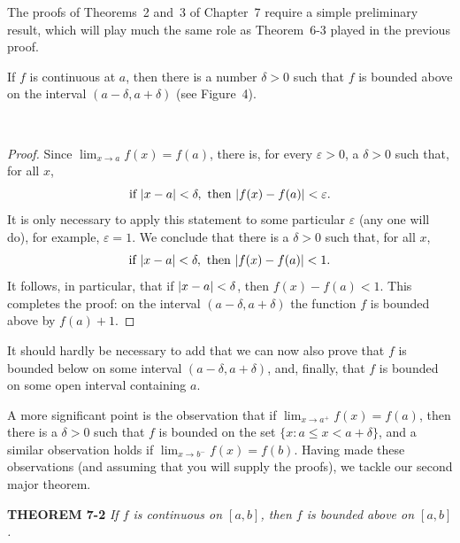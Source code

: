 The proofs of Theorems~2 and~3 of Chapter~7 require a simple preliminary
result, which will play much the same role as Theorem~6-3 played in the
previous proof.

\begin{theorem}
If $f$ is continuous at $a$, then there is a number $\delta > 0$ such that
$f$ is bounded above on the interval $(a - \delta, a + \delta)$ (see
Figure~4).
\end{theorem}

\begin{center}
\\[0.6em]
\end{center}

\begin{proof}
Since $\lim_{x \to a} f(x) = f(a)$, there is, for every $\varepsilon > 0$, a
$\delta > 0$ such that, for all $x$,
\[
\text{if }\lvert x - a\rvert < \delta,\text{ then }\lvert f(x) - f(a)\rvert < \varepsilon.
\]
It is only necessary to apply this statement to some particular $\varepsilon$
(any one will do), for example, $\varepsilon = 1$. We conclude that there is
a $\delta > 0$ such that, for all $x$,
\[
\text{if }\lvert x - a\rvert < \delta,\text{ then }\lvert f(x) - f(a)\rvert < 1.
\]
It follows, in particular, that if $\lvert x - a\rvert < \delta$, then
$f(x) - f(a) < 1$. This completes the proof: on the interval
$(a - \delta, a + \delta)$ the function $f$ is bounded above by $f(a) + 1$.
\end{proof}

It should hardly be necessary to add that we can now also prove that $f$ is
bounded below on some interval $(a - \delta, a + \delta)$, and, finally, that
$f$ is bounded on some open interval containing $a$.

A more significant point is the observation that if
$\lim_{x \to a^{+}} f(x) = f(a)$, then there is a $\delta > 0$ such that $f$
is bounded on the set $\{x : a \leq x < a + \delta\}$, and a similar
observation holds if $\lim_{x \to b^{-}} f(x) = f(b)$. Having made these
observations (and assuming that you will supply the proofs), we tackle our
second major theorem.

\medskip
\noindent\textbf{THEOREM 7-2}\enspace
\textit{If $f$ is continuous on $[a,b]$, then $f$ is bounded above on
$[a,b]$.}

